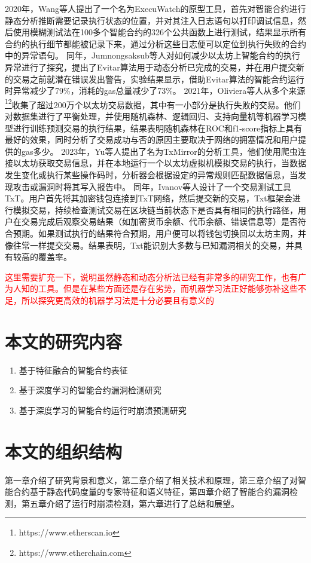 2020年，Wang等人提出了一个名为ExecuWatch\cite{wang2020onthe}的原型工具，首先对智能合约进行静态分析推断需要记录执行状态的位置，并对其注入日志语句以打印调试信息，然后使用模糊测试法在100多个智能合约的326个公共函数上进行测试，结果显示所有合约的执行细节都能被记录下来，通过分析这些日志便可以定位到执行失败的合约中的异常语句。
同年，Jumnongsaksub等人对如何减少以太坊上智能合约的执行异常进行了探究，提出了Evitar算法用于动态分析已完成的交易，并在用户提交新的交易之前就潜在错误发出警告，实验结果显示，借助Evitar算法的智能合约运行时异常减少了79\%，消耗的gas总量减少了73\%。
2021年，Oliviera等人从多个来源\footnote{https://www.etherscan.io}\footnote{https://www.etherchain.com}收集了超过200万个以太坊交易数据，其中有一小部分是执行失败的交易。他们对数据集进行了平衡处理，并使用随机森林、逻辑回归、支持向量机等机器学习模型进行训练预测交易的执行结果，结果表明随机森林在ROC和f1-score指标上具有最好的效果，同时分析了交易成功与否的原因主要取决于网络的拥塞情况和用户提供的gas多少。
2023年，Yu等人提出了名为TxMirror的分析工具，他们使用爬虫连接以太坊获取交易信息，并在本地运行一个以太坊虚拟机模拟交易的执行，当数据发生变化或执行某些操作码时，分析器会根据设定的异常规则匹配数据信息，当发现攻击或漏洞时将其写入报告中。
同年，Ivanov等人设计了一个交易测试工具TxT\cite{IvanovTxT}。用户首先将其加密钱包连接到TxT网络，然后提交新的交易，Txt框架会进行模拟交易，持续检查测试交易在区块链当前状态下是否具有相同的执行路径，用户在交易完成后观察交易结果（如加密货币余额、代币余额、错误信息等）是否符合预期。如果测试执行的结果符合预期，用户便可以将钱包切换回以太坊主网，并像往常一样提交交易。结果表明，Txt能识别大多数与已知漏洞相关的交易，并具有较高的覆盖率。

\textcolor{red}{这里需要扩充一下，说明虽然静态和动态分析法已经有非常多的研究工作，也有广为人知的工具。但是在某些方面还是存在劣势，而机器学习法正好能够弥补这些不足，所以探究更高效的机器学习法是十分必要且有意义的}

\section{本文的研究内容}
\begin{enumerate}[label=\Alph*., align=left, leftmargin=*]
    \item 基于特征融合的智能合约表征
    \item 基于深度学习的智能合约漏洞检测研究
    \item 基于深度学习的智能合约运行时崩溃预测研究
\end{enumerate}
\section{本文的组织结构}
第一章介绍了研究背景和意义，第二章介绍了相关技术和原理，第三章介绍了对智能合约基于静态代码度量的专家特征和语义特征，第四章介绍了智能合约漏洞检测，第五章介绍了运行时崩溃检测，第六章进行了总结和展望。